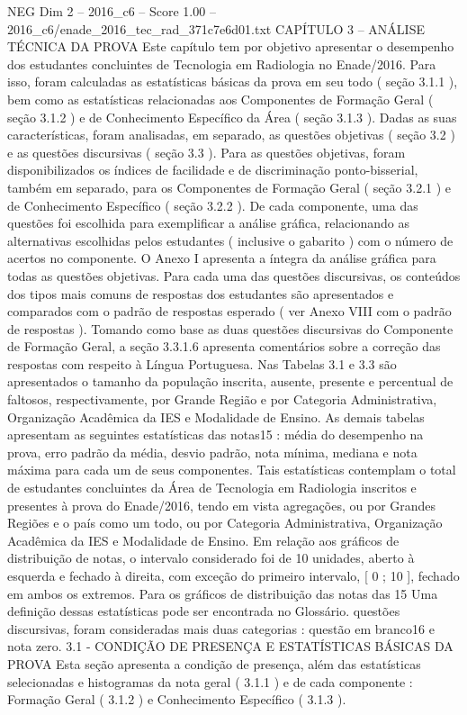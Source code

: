\begin{textsample}{NEG Dim 2 – 2016\_c6 – Score 1.00 – 2016\_c6/enade\_2016\_tec\_rad\_371c7e6d01.txt}  \label{ex:f2_neg_225}
CAPÍTULO 3 – ANÁLISE TÉCNICA DA PROVA Este capítulo tem por objetivo apresentar o desempenho dos estudantes concluintes de Tecnologia em Radiologia no Enade/2016.
Para isso, foram calculadas as estatísticas básicas da prova em seu todo ( seção 3.1.1 ), bem como as estatísticas relacionadas aos Componentes de Formação Geral ( seção 3.1.2 ) e de Conhecimento Específico da Área ( seção 3.1.3 ).
Dadas as suas características, foram analisadas, em separado, as questões objetivas ( seção 3.2 ) e as questões discursivas ( seção 3.3 ).
Para as questões objetivas, foram disponibilizados os índices de facilidade e de discriminação ponto-bisserial, também em separado, para os Componentes de Formação Geral ( seção 3.2.1 ) e de Conhecimento Específico ( seção 3.2.2 ).
De cada componente, uma das questões foi escolhida para exemplificar a análise gráfica, relacionando as alternativas escolhidas pelos estudantes ( inclusive o gabarito ) com o número de acertos no componente.
O Anexo I apresenta a íntegra da análise gráfica para todas as questões objetivas.
Para cada uma das questões discursivas, os conteúdos dos tipos mais comuns de respostas dos estudantes são apresentados e comparados com o padrão de respostas esperado ( ver Anexo VIII com o padrão de respostas ).
Tomando como base as duas questões discursivas do Componente de Formação Geral, a seção 3.3.1.6 apresenta comentários sobre a correção das respostas com respeito à Língua Portuguesa.
Nas Tabelas 3.1 e 3.3 são apresentados o tamanho da população inscrita, ausente, presente e percentual de faltosos, respectivamente, por Grande Região e por Categoria Administrativa, Organização Acadêmica da IES e Modalidade de Ensino.
As demais tabelas apresentam as seguintes estatísticas das notas15 : média do desempenho na prova, erro padrão da média, desvio padrão, nota mínima, mediana e nota máxima para cada um de seus componentes.
Tais estatísticas contemplam o total de estudantes concluintes da Área de Tecnologia em Radiologia inscritos e presentes à prova do Enade/2016, tendo em vista agregações, ou por Grandes Regiões e o país como um todo, ou por Categoria Administrativa, Organização Acadêmica da IES e Modalidade de Ensino.
Em relação aos gráficos de distribuição de notas, o intervalo considerado foi de 10 unidades, aberto à esquerda e fechado à direita, com exceção do primeiro intervalo, [ 0 ; 10 ], fechado em ambos os extremos.
Para os gráficos de distribuição das notas das 15 Uma definição dessas estatísticas pode ser encontrada no Glossário. questões discursivas, foram consideradas mais duas categorias : questão em branco16 e nota zero. 3.1 - CONDIÇÃO DE PRESENÇA E ESTATÍSTICAS BÁSICAS DA PROVA Esta seção apresenta a condição de presença, além das estatísticas selecionadas e histogramas da nota geral ( 3.1.1 ) e de cada componente : Formação Geral ( 3.1.2 ) e Conhecimento Específico ( 3.1.3 ).

\end{textsample}
